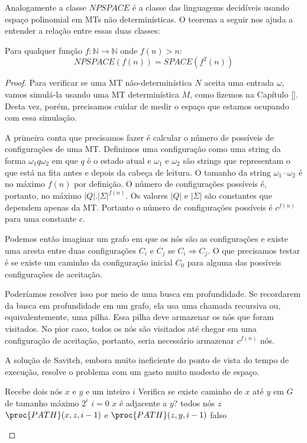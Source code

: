 Analogamente a classe $NPSPACE$ é a classe das linguagems decidíveis usando espaço polinomial em MTs não determinísticas.
O teorema a seguir nos ajuda a entender a relação entre essas duas classes:

\begin{theorem}[Savitch]
  Para qualquer função $f: \mathbb{N} \to \mathbb{N}$ onde $f(n) > n$:
  \begin{displaymath}
    NPSPACE(f(n)) = SPACE(f^2(n))
  \end{displaymath}
\end{theorem}

\begin{proof}
  Para verificar se uma MT não-determinística $N$ aceita uma entrada $\omega$, vamos simulá-la usando uma MT determinística $M$, como fizemos na Capítulo \ref{}.
  Desta vez, porém, precisamos cuidar de medir o espaço que estamos ocupando com essa simulação.

  A primeira conta que precisamos fazer é calcular o número de possíveis de configurações de uma MT.
  Definimos uma configuração como uma string da forma $\omega_1 q \omega_2$ em que $q$ é o estado atual e $\omega_1$ e $\omega_2$ são strings que representam o que está na fita antes e depois da cabeça de leitura.
  O tamanho da string $\omega_1 \cdot \omega_2$ é no máximo $f(n)$ por definição.
  O número de configurações possíveis é, portanto, no máximo $|Q|.|\Sigma|^{f(n)}$.
  Os valores $|Q|$ e $|\Sigma|$ são constantes que dependem apenas da MT.
  Portanto o número de configurações possíveis é $c^{f(n)}$ para uma constante $c$.

  Podemos então imaginar um grafo em que os nós são as configurações e existe uma aresta entre duas configurações $C_i$ e $C_j$ se $C_i \Rightarrow C_j$.
  O que precisamos testar é se existe um caminho da configuração inicial $C_0$ para alguma das possíveis configurações de aceitação.

  Poderíamos resolver isso por meio de uma busca em profundidade.
  Se recordarem da busca em profundidade em um grafo, ela usa uma chamada recursiva ou, equivalentemente, uma pilha.
  Essa pilha deve armazenar os nós que foram visitados.
  No pior caso, todos os nós são visitados até chegar em uma configuração de aceitação, portanto, seria necessário armazenar $c^{f(n)}$ nós.

  A solução de Savitch, embora muito ineficiente do ponto de vista do tempo de execução, resolve o problema com um gasto muito modesto de espaço.

  \begin{codebox}
    \li \Comment Recebe dois nós $x$ e $y$ e um inteiro $i$
    \li \Comment Verifica se existe caminho de $x$ até $y$ em $G$ de tamanho máximo $2^i$
    \li \If $i = 0$
    \li \Then \Return $x$ é adjacente a $y$?
    \End
    \li \For todos nós $z$
    \li     \Then \Return $\proc{PATH}(x, z, i-1)$ e $\proc{PATH}(z, y, i-1)$
    \End
    \li \Return falso
  \end{codebox}
  

\end{proof}
